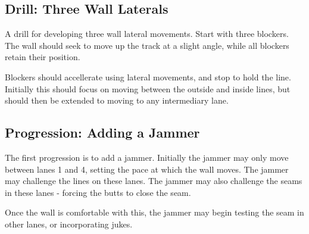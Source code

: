 \subsection*{Drill: Three Wall Laterals} 
\label{drill:three_wall:laterals}

A drill for developing three wall lateral movements.
Start with three blockers. The wall should seek to move up the track at a slight angle, while all blockers retain their position. 

Blockers should accellerate using lateral movements, and stop to hold the line.
Initially this should focus on moving between the outside and inside lines, but should then be extended to moving to any intermediary lane. 


\subsection*{Progression: Adding a Jammer}
\label{drill:three_wall:laterals:jammer}

The first progression is to add a jammer.
Initially the jammer may only move between lanes 1 and 4, setting the pace at which the wall moves. 
The jammer may challenge the lines on these lanes.
The jammer may also challenge the seams in these lanes - forcing the butts to close the seam.  

Once the wall is comfortable with this, the jammer may begin testing the seam in other lanes, or incorporating jukes.  
